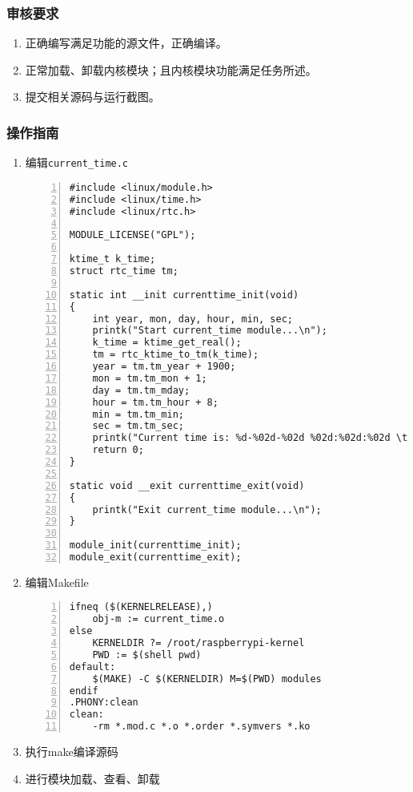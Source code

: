 \documentclass{article}
\begin{document}
\subsubsection{审核要求}
\begin{enumerate}
    \item 正确编写满足功能的源文件，正确编译。
    \item 正常加载、卸载内核模块；且内核模块功能满足任务所述。
    \item 提交相关源码与运行截图。
\end{enumerate}

\subsubsection{操作指南}
\begin{enumerate}

    \item 编辑\verb|current_time.c|
\begin{lstlisting}[numbers=left]
#include <linux/module.h>
#include <linux/time.h>
#include <linux/rtc.h>

MODULE_LICENSE("GPL");

ktime_t k_time;
struct rtc_time tm;

static int __init currenttime_init(void)
{
	int year, mon, day, hour, min, sec;
	printk("Start current_time module...\n");
	k_time = ktime_get_real();
	tm = rtc_ktime_to_tm(k_time); 
	year = tm.tm_year + 1900;
	mon = tm.tm_mon + 1;
	day = tm.tm_mday;
	hour = tm.tm_hour + 8;
	min = tm.tm_min;
	sec = tm.tm_sec;
	printk("Current time is: %d-%02d-%02d %02d:%02d:%02d \t printed from SYL\n", year, mon, day, hour, min, sec);
	return 0;
}

static void __exit currenttime_exit(void)
{
	printk("Exit current_time module...\n");
}

module_init(currenttime_init);
module_exit(currenttime_exit);

\end{lstlisting}
    \item 编辑Makefile
\begin{lstlisting}[numbers=left]
ifneq ($(KERNELRELEASE),)
	obj-m := current_time.o
else
	KERNELDIR ?= /root/raspberrypi-kernel
	PWD := $(shell pwd)
default:
	$(MAKE) -C $(KERNELDIR) M=$(PWD) modules
endif
.PHONY:clean
clean:
	-rm *.mod.c *.o *.order *.symvers *.ko

\end{lstlisting}
    \item 执行make编译源码
    \item 进行模块加载、查看、卸载
\end{enumerate}
\end{document}
